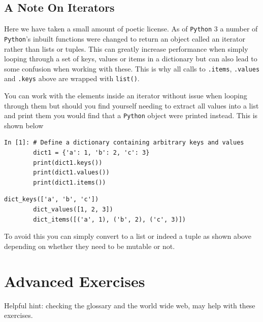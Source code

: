 \begin{tcolorbox}[colback=red!5!white,colframe=red!75!black]
\subsection{A Note On Iterators}
Here we have taken a small amount of poetic license. As of \texttt{Python} 3 a number of \texttt{Python}'s inbuilt functions were changed to return an object called an iterator rather than lists or tuples. This can greatly increase performance when simply looping through a set of keys, values or items in a dictionary but can also lead to some confusion when working with these. This is why all calls to \texttt{.items}, \texttt{.values} and \texttt{.keys} above are wrapped with \texttt{list()}.

You can work with the elements inside an iterator without issue when looping through them but should you find yourself needing to extract all values into a list and print them you would find that a \texttt{Python} object were printed instead. This is shown below

\begin{lstlisting}[style=PY]
In [1]: # Define a dictionary containing arbitrary keys and values
        dict1 = {'a': 1, 'b': 2, 'c': 3}
        print(dict1.keys())
        print(dict1.values())
        print(dict1.items())
\end{lstlisting}
\begin{lstlisting}[style=PY_out]
        dict_keys(['a', 'b', 'c'])
        dict_values([1, 2, 3])
        dict_items([('a', 1), ('b', 2), ('c', 3)])
\end{lstlisting}

To avoid this you can simply convert to a list or indeed a tuple as shown above depending on whether they need to be mutable or not.

\end{tcolorbox}

\section{Advanced Exercises}

Helpful hint: checking the glossary and the world wide web, may help with these exercises.

